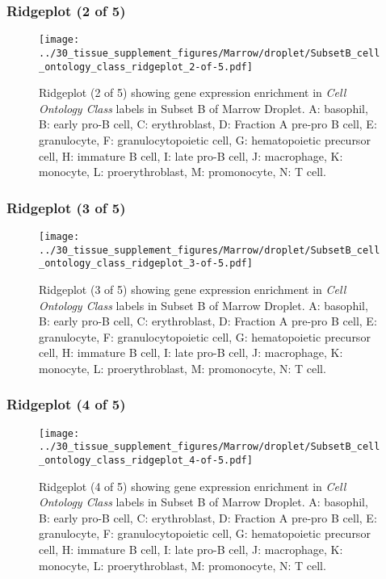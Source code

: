 \clearpage

\subsubsection{Ridgeplot (2 of 5)}
\begin{figure}[h]
\centering
\texttt{[image: ../30\_tissue\_supplement\_figures/Marrow/droplet/SubsetB\_cell\_ontology\_class\_ridgeplot\_2-of-5.pdf]}

\caption{ Ridgeplot (2 of 5)  showing gene expression enrichment in \emph{Cell Ontology Class} labels in Subset B of Marrow Droplet. A: basophil, B: early pro-B cell, C: erythroblast, D: Fraction A pre-pro B cell, E: granulocyte, F: granulocytopoietic cell, G: hematopoietic precursor cell, H: immature B cell, I: late pro-B cell, J: macrophage, K: monocyte, L: proerythroblast, M: promonocyte, N: T cell.}
\end{figure}


\clearpage

\subsubsection{Ridgeplot (3 of 5)}
\begin{figure}[h]
\centering
\texttt{[image: ../30\_tissue\_supplement\_figures/Marrow/droplet/SubsetB\_cell\_ontology\_class\_ridgeplot\_3-of-5.pdf]}

\caption{ Ridgeplot (3 of 5)  showing gene expression enrichment in \emph{Cell Ontology Class} labels in Subset B of Marrow Droplet. A: basophil, B: early pro-B cell, C: erythroblast, D: Fraction A pre-pro B cell, E: granulocyte, F: granulocytopoietic cell, G: hematopoietic precursor cell, H: immature B cell, I: late pro-B cell, J: macrophage, K: monocyte, L: proerythroblast, M: promonocyte, N: T cell.}
\end{figure}


\clearpage

\subsubsection{Ridgeplot (4 of 5)}
\begin{figure}[h]
\centering
\texttt{[image: ../30\_tissue\_supplement\_figures/Marrow/droplet/SubsetB\_cell\_ontology\_class\_ridgeplot\_4-of-5.pdf]}

\caption{ Ridgeplot (4 of 5)  showing gene expression enrichment in \emph{Cell Ontology Class} labels in Subset B of Marrow Droplet. A: basophil, B: early pro-B cell, C: erythroblast, D: Fraction A pre-pro B cell, E: granulocyte, F: granulocytopoietic cell, G: hematopoietic precursor cell, H: immature B cell, I: late pro-B cell, J: macrophage, K: monocyte, L: proerythroblast, M: promonocyte, N: T cell.}
\end{figure}


